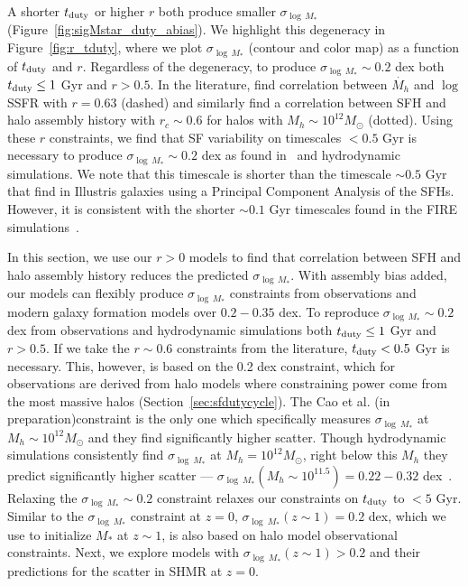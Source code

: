 \documentclass[12pt, letterpaper, preprint, tighten]{aastex62}
\newcommand{\edt}[1]{{\color{dred}{\bf} #1}}
\newcommand{\cao}{Cao et al. (in preparation)}
\newcommand{\tduty}{t_{\rm duty}}
\begin{document}
A shorter $t_{\rm duty}$ or higher $r$ both produce smaller $\sigma_{\log\,M_*}$ 
(Figure~\ref{fig:sigMstar_duty_abias}). We highlight this degeneracy in 
Figure~\ref{fig:r_tduty}, where we plot $\sigma_{\log\,M_*}$ (contour and 
color map) as a function of $t_{\rm duty}$ and $r$. Regardless of the 
degeneracy, to produce $\sigma_{\log\,M_*} \sim 0.2$ dex both $\tduty \leq 1$ Gyr 
and $r > 0.5$. In the literature, \cite{tinker2018b} find correlation 
between $\dot{M_h}$ and $\log$ SSFR with $r = 0.63$ (dashed) and 
\cite{behroozi2018} similarly find a correlation between SFH and halo 
assembly history with $r_c \sim 0.6$ for halos with $M_h \sim 10^{12}M_\odot$ 
(dotted). Using these $r$ constraints, we find that SF variability on 
timescales $< 0.5$ Gyr is necessary to produce $\sigma_{\log\,M_*} \sim 0.2$ dex
as found in~\cite{more2011, leauthaud2012, reddick2013, tinker2013, zu2015} 
and hydrodynamic simulations. We note that this timescale is shorter than 
the timescale $\sim 0.5$ Gyr that \cite{sparre2015} find in Illustris galaxies 
using a Principal Component Analysis of the SFHs. However, it is consistent with 
the shorter $\sim 0.1$ Gyr timescales found in the FIRE simulations~\citep{hopkins2014, sparre2017}. 

\edt{In this section, we use our $r > 0$ models to find that correlation between
SFH and halo assembly history reduces the predicted $\sigma_{\log\,M_*}$. 
With assembly bias added, our models can flexibly produce $\sigma_{\log\,M_*}$ 
constraints from observations and modern galaxy formation models over 
$0.2 - 0.35$ dex. To reproduce $\sigma_{\log\,M_*}\sim 0.2$ dex from observations 
and hydrodynamic simulations both $t_{\rm duty} \leq 1$ Gyr and $r > 0.5$. If
we take the $r\sim0.6$ constraints from the literature, $t_{\rm duty} < 0.5$ Gyr 
is necessary. This, however, is based on the 0.2 dex constraint, which 
for observations are derived from halo models where constraining power 
come from the most massive halos (Section~\ref{sec:sfdutycycle}). The 
\cao constraint is the only one which specifically measures $\sigma_{\log~M_*}$ 
at $M_h \sim 10^{12}M_\odot$ and they find significantly higher scatter. 
Though hydrodynamic simulations consistently find $\sigma_{\log~M_*}$ at 
$M_h = 10^{12}M_\odot$, right below this $M_h$ they predict significantly 
higher scatter --- $\sigma_{\log~M_*}(M_h\sim 10^{11.5}) = 0.22 - 0.32$ 
dex~\citep{wechsler2018}. Relaxing the $\sigma_{\log~M_*} \sim 0.2$ constraint
relaxes our constraints on $\tduty$ to $< 5$ Gyr. Similar to the $\sigma_{\log~M_*}$ 
constraint at $z=0$, $\sigma_{\log~M_*}(z\sim1) = 0.2$ dex, which we use to initialize 
$M_*$ at $z\sim1$, is also based on halo model observational constraints. 
Next, we explore models with $\sigma_{\log~M_*}(z\sim1) > 0.2$ and their 
predictions for the scatter in SHMR at $z=0$. 
}
\end{document}
